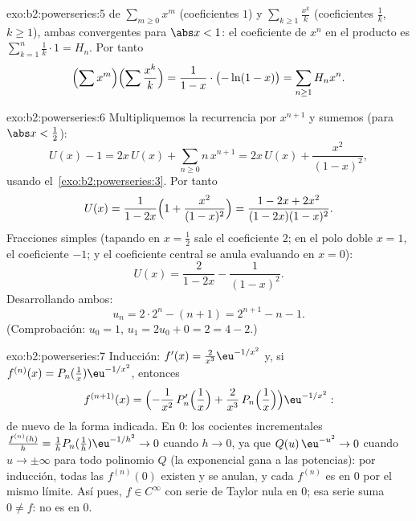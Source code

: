 \begin{solution}{exo:b2:powerseries:5}
 de $\sum_{m \geq 0} x^m$ (coeficientes $1$) y
$\sum_{k\geq1} \frac{x^k}{k}$ (coeficientes $\frac1k$, $k \geq 1$),
ambas  convergentes para $\abs x < 1$: el
coeficiente de $x^n$ en el producto es $\sum_{k=1}^{n} \frac1k \cdot
1 = H_n$. Por tanto
\[
\Bigl(\sum x^m\Bigr)\Bigl(\sum \frac{x^k}{k}\Bigr)
= \frac{1}{1-x}\cdot\bigl(-\ln(1-x)\bigr)
= \sum_{n\geq1} H_n x^n .
\]
\end{solution}

\begin{solution}{exo:b2:powerseries:6}
Multipliquemos la recurrencia por $x^{n+1}$ y sumemos (para $\abs x
< \frac12$):
\[
U(x) - 1 = 2x\,U(x) + \sum_{n\geq0} n\,x^{n+1}
= 2x\,U(x) + \frac{x^2}{(1-x)^2} ,
\]
usando el~\cref{exo:b2:powerseries:3}. Por tanto
\[
U(x) = \frac{1}{1 - 2x}\Bigl(1 + \frac{x^2}{(1-x)^2}\Bigr)
= \frac{1 - 2x + 2x^2}{(1-2x)(1-x)^2} .
\]
Fracciones simples (tapando en $x = \frac12$ sale el coeficiente
$2$; en el polo doble $x = 1$, el coeficiente $-1$; y el coeficiente
central se anula evaluando en $x = 0$):
\[
U(x) = \frac{2}{1-2x} - \frac{1}{(1 - x)^2} .
\]
Desarrollando ambos:
\[
u_n = 2\cdot 2^n - (n + 1) = 2^{n+1} - n - 1 .
\]
(Comprobación: $u_0 = 1$, $u_1 = 2u_0 + 0 = 2 = 4 - 2$.)
\end{solution}

\begin{solution}{exo:b2:powerseries:7}
Inducción: $f'(x) = \frac{2}{x^3}\eu^{-1/x^2}$ y, si $f^{(n)}(x) =
P_n(\tfrac1x)\eu^{-1/x^2}$, entonces
\[
f^{(n+1)}(x) =
\Bigl(-\frac{1}{x^2}\,P_n'\Bigl(\frac1x\Bigr) +
\frac{2}{x^3}\,P_n\Bigl(\frac1x\Bigr)\Bigr)\eu^{-1/x^2} :
\]
de nuevo de la forma indicada. En $0$: los cocientes incrementales
$\frac{f^{(n)}(h)}{h} = \frac1h P_n(\frac1h)\eu^{-1/h^2} \to 0$
cuando $h \to 0$, ya que $Q(u)\,\eu^{-u^2} \to 0$ cuando $u \to
\pm\infty$ para todo polinomio $Q$ (la exponencial gana a las
potencias): por inducción, todas las $f^{(n)}(0)$ existen y se
anulan, y cada $f^{(n)}$ es  en $0$ por el mismo límite.
Así pues, $f \in C^\infty$ con serie de Taylor nula en $0$; esa
serie suma $0 \neq f$: no es  en $0$.
\end{solution}

